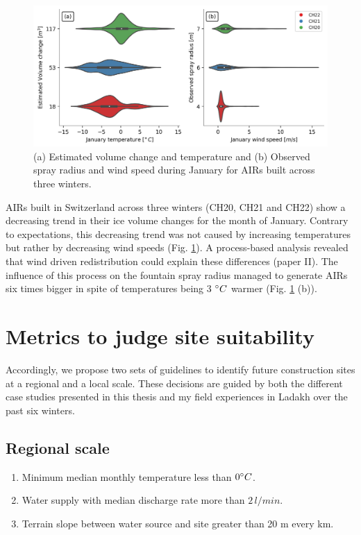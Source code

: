 \begin{figure}[htb]
\centering
\includegraphics[width=\textwidth]{figs/CH_diffs.jpg}
\caption{(a) Estimated volume change and temperature and (b) Observed spray radius and wind speed
during January for AIRs built across three winters. } 
\label{fig:CH_diffs}
\end{figure}

AIRs built in Switzerland across three winters (CH20, CH21 and CH22) show a decreasing trend in their ice volume
changes for the month of January. Contrary to expectations, this decreasing trend was not caused by increasing
temperatures but rather by decreasing wind speeds (Fig. \ref{fig:CH_diffs}). A process-based analysis revealed
that wind driven redistribution could explain these differences (paper II). The influence of this process on
the fountain spray radius managed to generate AIRs six times bigger in spite of temperatures being 3 $^{\circ} C$
warmer (Fig. \ref{fig:CH_diffs} (b)). 



\section{Metrics to judge site suitability}

Accordingly, we propose two sets of guidelines to identify future construction sites at a regional and a local
scale. These decisions are guided by both the different case studies presented in this thesis and my field
experiences in Ladakh over the past six winters.

\subsection{Regional scale}

\begin{enumerate}

  \item Minimum median monthly temperature less than $0 ^{\circ} C$. 
  \item Water supply with median discharge rate more than $2\, l/min$.
  \item Terrain slope between water source and site greater than 20 m every km. 

\end{enumerate}

